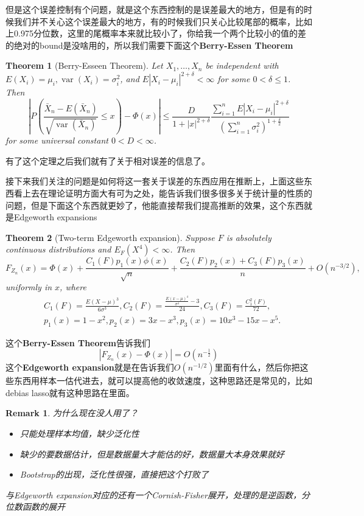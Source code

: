 \documentclass{article}
\newtheorem{theorem}{Theorem}[section]
\newtheorem{remark}{Remark}[theorem]
\begin{document}
\par 但是这个误差控制有个问题，就是这个东西控制的是误差最大的地方，但是有的时候我们并不关心这个误差最大的地方，有的时候我们只关心比较尾部的概率，比如上0.975分位数，这里的尾概率本来就比较小了，你给我一个两个比较小的值的差的绝对的bound是没啥用的，所以我们需要下面这个\textbf{Berry-Essen Theorem}
\begin{theorem}[Berry-Esseen Theorem]
	Let $X_1, \ldots, X_n$ be independent with $E\left(X_i\right)=\mu_i, \operatorname{var}\left(X_i\right)=\sigma_i^2$, and $E\left|X_i-\mu_i\right|^{2+\delta}<\infty$ for some $0<\delta \leq 1$. Then
	$$
	\left|P\left(\frac{\bar{X}_n-E\left(\bar{X}_n\right)}{\sqrt{\operatorname{var}\left(\bar{X}_n\right)}} \leq x\right)-\Phi(x)\right| \leq \frac{D}{1+|x|^{2+\delta}} \frac{\sum_{i=1}^n E\left|X_i-\mu_i\right|^{2+\delta}}{\left(\sum_{i=1}^n \sigma_i^2\right)^{1+\frac{\delta}{2}}}
	$$
	for some universal constant $0<D<\infty$.
\end{theorem}
有了这个定理之后我们就有了关于相对误差的信息了。
\par 接下来我们关注的问题是如何将这一套关于误差的东西应用在推断上，上面这些东西看上去在理论证明方面大有可为之处，能告诉我们很多很多关于统计量的性质的问题，但是下面这个东西就更妙了，他能直接帮我们提高推断的效果，这个东西就是Edgeworth expansions
\begin{theorem}[Two-term Edgeworth expansion]
	Suppose $F$ is absolutely continuous distributions and $E_F\left(X^4\right)<\infty$. Then
	$$
	F_{Z_n}(x)=\Phi(x)+\frac{C_1(F) p_1(x) \phi(x)}{\sqrt{n}}+\frac{C_2(F) p_2(x)+C_3(F) p_3(x)}{n}+O\left(n^{-3 / 2}\right),
	$$
	uniformly in $x$, where
	$$
	\begin{aligned}
		& C_1(F)=\frac{E(X-\mu)^3}{6 \sigma^3}, C_2(F)=\frac{\frac{E(x-\mu)^4}{\sigma^4}-3}{24}, C_3(F)=\frac{C_1^2(F)}{72}, \\
		& p_1(x)=1-x^2, p_2(x)=3 x-x^3, p_3(x)=10 x^3-15 x-x^5 .
	\end{aligned}
	$$
\end{theorem}
这个\textbf{Berry-Essen Theorem}告诉我们
$$|F_{Z_n}(x)-\Phi(x)|=O(n^{-\frac{1}{2}})$$
这个\textbf{Edgeworth expansion}就是在告诉我们$O(n^{-1/2})$里面有什么，然后你把这些东西用样本一估代进去，就可以提高他的收敛速度，这种思路还是常见的，比如debias lasso就有这种思路在里面。
\begin{remark}
	\par 为什么现在没人用了？
	\begin{itemize}
		\item 只能处理样本均值，缺少泛化性
		\item 缺少的要数据估计，但是数据量大才能估的好，数据量大本身效果就好
		\item Bootstrap的出现，泛化性很强，直接把这个打败了
	\end{itemize}
	与Edgeworth expansion对应的还有一个Cornish-Fisher展开，处理的是逆函数，分位数函数的展开
\end{remark}
\end{document}
